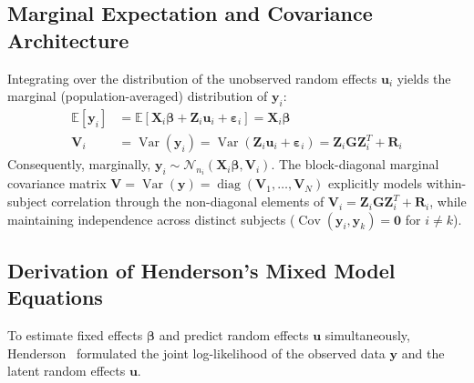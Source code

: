\documentclass[11pt,twoside,openright]{book}
\begin{document}
\subsection{Marginal Expectation and Covariance Architecture}

Integrating over the distribution of the unobserved random effects $\mathbf{u}_i$ yields the marginal (population-averaged) distribution of $\mathbf{y}_i$:
\begin{align}
\mathbb{E}[\mathbf{y}_i] &= \mathbb{E}[\mathbf{X}_i \boldsymbol{\beta} + \mathbf{Z}_i \mathbf{u}_i + \boldsymbol{\varepsilon}_i] = \mathbf{X}_i \boldsymbol{\beta} \\
\mathbf{V}_i &= \operatorname{Var}(\mathbf{y}_i) = \operatorname{Var}(\mathbf{Z}_i \mathbf{u}_i + \boldsymbol{\varepsilon}_i) = \mathbf{Z}_i \mathbf{G} \mathbf{Z}_i^T + \mathbf{R}_i \label{eq:marginal_var}
\end{align}
Consequently, marginally, $\mathbf{y}_i \sim \mathcal{N}_{n_i}(\mathbf{X}_i \boldsymbol{\beta}, \mathbf{V}_i)$. The block-diagonal marginal covariance matrix $\mathbf{V} = \operatorname{Var}(\mathbf{y}) = \operatorname{diag}(\mathbf{V}_1, \dots, \mathbf{V}_N)$ explicitly models within-subject correlation through the non-diagonal elements of $\mathbf{V}_i = \mathbf{Z}_i \mathbf{G} \mathbf{Z}_i^T + \mathbf{R}_i$, while maintaining independence across distinct subjects ($\operatorname{Cov}(\mathbf{y}_i, \mathbf{y}_k) = \mathbf{0}$ for $i \neq k$).

\subsection{Derivation of Henderson's Mixed Model Equations}

To estimate fixed effects $\boldsymbol{\beta}$ and predict random effects $\mathbf{u}$ simultaneously, Henderson~\cite{henderson1953} formulated the joint log-likelihood of the observed data $\mathbf{y}$ and the latent random effects $\mathbf{u}$.
\end{document}

